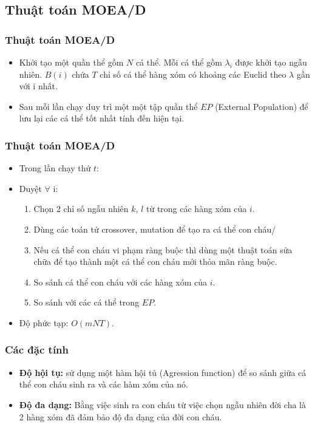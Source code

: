 \documentclass{beamer}
\begin{document}
\subsection{\textbf{Thuật toán MOEA/D}}

    \begin{frame}
    \frametitle{\textbf{Thuật toán MOEA/D}}
        \begin{itemize} 
            \item<1-> Khởi tạo một quần thể gồm $ N $ cá thể. Mỗi cá thể gồm $ \lambda_{i} $ được khởi tạo ngẫu nhiên.
                    $ B(i) $ chứa $ T $ chỉ số cá thể hàng xóm có khoảng các Euclid theo $ \lambda $ gần với i nhất.
            \item<2-> Sau mỗi lần chạy duy trì một một tập quần thể $ EP $ (External Population) để lưu
                    lại các cá thể tốt nhất tính đến hiện tại.
        \end{itemize}
    \end{frame}

    \begin{frame}
    \frametitle{\textbf{Thuật toán MOEA/D}} 
        \begin{itemize}
            \item<1-> Trong lần chạy thứ $ t $:
            \item<2-> Duyệt $ \forall $ i:
            \begin{enumerate}
                \item<2-> Chọn 2 chỉ số ngẫu nhiên $ k $, $ l $ từ trong các hàng xóm của $ i $.
                \item<2-> Dùng các toán tử crossover, mutation để tạo ra cá thể con cháu/
                \item<2-> Nếu cá thể con cháu vi phạm ràng buộc thì dùng một thuật toán sửa chữa để tạo thành một
                cá thể con cháu mới thỏa mãn ràng buộc.
                \item<3-> So sánh cá thể con cháu với các hàng xóm của $ i $. 
                \item<3-> So sánh với các cá thể trong $ EP $.
            \end{enumerate}
            \item<4-> Độ phức tạp: $ O(mNT) $.
        \end{itemize}
    \end{frame}

    \begin{frame}
    \frametitle{\textbf{Các đặc tính}}
        \begin{itemize}
            \item<1-> \textbf{Độ hội tụ:} sử dụng một hàm hội tủ (Agression function)
            để so sánh giữa cá thể con cháu sinh ra và các hàm xóm của nó.
            \item<2-> \textbf{Độ đa dạng:} Bằng việc sinh ra con cháu từ việc chọn ngẫu
            nhiên đời cha là 2 hàng xóm đã đảm bảo độ đa dạng của đời con cháu.
        \end{itemize}

    \end{frame}
\end{document}

